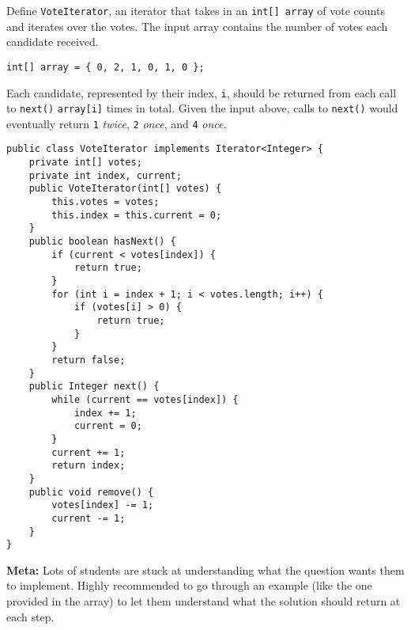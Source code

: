 \question Define \texttt{VoteIterator}, an iterator that takes in an \texttt{int[] array} of vote counts and iterates over the votes. The input array contains the number of votes each candidate received.

\begin{lstlisting}
int[] array = { 0, 2, 1, 0, 1, 0 };
\end{lstlisting}

Each candidate, represented by their index, \texttt{i}, should be returned from each call to \texttt{next()} \texttt{array[i]} times in total. Given the input above, calls to \texttt{next()} would eventually return \texttt{1} \textit{twice}, \texttt{2} \textit{once}, and \texttt{4} \textit{once}.

\begin{solution}[3in]
\begin{lstlisting}
public class VoteIterator implements Iterator<Integer> {
    private int[] votes;
    private int index, current;
    public VoteIterator(int[] votes) {
        this.votes = votes;
        this.index = this.current = 0;
    }
    public boolean hasNext() {
        if (current < votes[index]) {
            return true;
        }
        for (int i = index + 1; i < votes.length; i++) {
            if (votes[i] > 0) {
                return true;
            }
        }
        return false;
    }
    public Integer next() {
        while (current == votes[index]) {
            index += 1;
            current = 0;
        }
        current += 1;
        return index;
    }
    public void remove() {
        votes[index] -= 1;
        current -= 1;
    }
}
\end{lstlisting}
\textbf{Meta:} Lots of students are stuck at understanding what the question
wants them to implement. Highly recommended to go through an example (like
the one provided in the array) to let them understand what the solution should
return at each step.
\end{solution}
